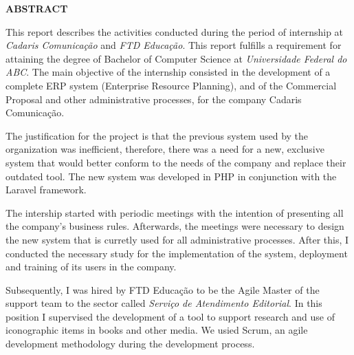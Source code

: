 \documentclass[
  12pt,            %
  openany,
  oneside,
  a4paper,         %
  english,      %
  brazil
]{article}
\numberwithin{figure}{section}
\numberwithin{table}{section}
\begin{document}
\begin{titlepage}

\begin{center}
  \textbf{ABSTRACT}
\end{center}

This report describes the activities conducted during the period of internship at \textit{Cadaris Comunicação} and \textit{FTD Educação}. This report fulfills a requirement for attaining the degree of Bachelor of Computer Science at \textit{Universidade Federal do ABC}. The main objective of the internship consisted in the development of a complete ERP system (Enterprise Resource Planning), and of the Commercial Proposal and other administrative processes, for the company Cadaris Comunicação.

The justification for the project is that the previous system used by the organization was inefficient, therefore, there was a need for a new, exclusive system that would better conform to the needs of the company and replace their outdated tool. The new system was developed in PHP in conjunction with the Laravel framework.

The intership started with periodic meetings with the intention of presenting all the company's business rules. Afterwards, the meetings were necessary to design the new system that is curretly used for all administrative processes. After this, I conducted the necessary study for the implementation of the system, deployment and training of its users in the company.

Subsequently, I was hired by FTD Educação to be the Agile Master of the support team to the sector called \textit{Serviço de Atendimento Editorial}. In this position I supervised the development of a tool to support research and use of iconographic items in books and other media. We usied Scrum, an agile development methodology during the development process.

\end{titlepage}



\begin{titlepage}

\begin{singlespace}
  \listoffigures
\end{singlespace}

\end{titlepage}


\end{document}

